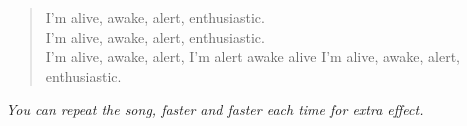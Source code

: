 
\begin{verse}
I'm alive, awake, alert, enthusiastic. \\

I'm alive, awake, alert, enthusiastic. \\

I'm alive, awake, alert, I'm alert awake alive I'm alive, awake, alert, enthusiastic. \\
\end{verse}

\textit{You can repeat the song, faster and faster each time for extra effect.}
